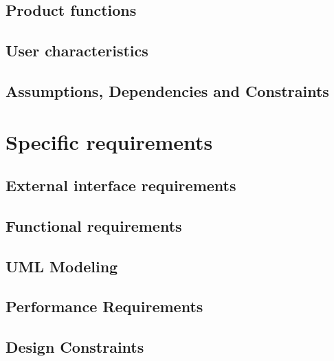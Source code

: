 \documentclass[12pt, a4paper]{report}
\begin{document}
\section{Product functions}


\section{User characteristics}


\section{Assumptions, Dependencies and Constraints}


%

\chapter{Specific requirements}
\label{ch:requirements}

\section{External interface requirements}


\section{Functional requirements}


\section{UML Modeling}



\section{Performance Requirements}


\section{Design Constraints}

\end{document}
